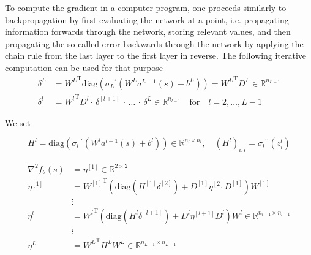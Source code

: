 To compute the gradient in a computer program, one proceeds similarly to backpropagation by first evaluating the network at a point, i.e. propagating information forwards through the network, storing relevant values, and then propagating the so-called error backwards through the network by applying the chain rule from the last layer to the first layer in reverse. The following iterative computation can be used for that purpose
\begin{align*}
    \delta^{L} & = {W^{L}}^{\mathrm{T}} \mathrm{diag}({\sigma_{L}}^{\prime}(W^{L} a^{L-1}(s) + b^{L})) = {W^{L}}^{\mathrm{T}} D^{L} \in \mathbb{R}^{n_{L-1}} \\
    \delta^{l} & = {W^{l}}^{\mathrm{T}} D^{l} \cdot \, \delta^{[l+1]} \, \cdot \, \ldots \,  \cdot \, \delta^{L} \in \mathbb{R}^{n_{l-1}} \quad \text{for} \quad l = 2, \ldots, L-1
\end{align*}


We set 

\begin{equation*}
    H^{l} = \mathrm{diag}({\sigma_{l}}^{\prime \prime}(W^{l} a^{l-1}(s) + b^{l})) \in \mathbb{R}^{n_l \times n_l}, \quad (H^{l})_{i, i} = {\sigma_{l}}^{\prime \prime} (z_{i}^{l})
\end{equation*}

\begin{align*}
    \nabla^{2} f_{\theta}(s) & = \eta^{[1]} \in \mathbb{R}^{2 \times 2} \\
    \eta^{[1]} & = {W^{[1]}}^{\mathrm{T}} \left( \mathrm{diag}(H^{[1]} \delta^{[2]}) + D^{[1]} \eta^{[2]} D^{[1]} \right) W^{[1]} \\
    & \vdots \\
    \eta^{l} & = {W^{l}}^{\mathrm{T}} \left( \mathrm{diag}(H^{l} \delta^{[l+1]}) + D^{l} \eta^{[l+1]} D^{l} \right) W^{l} \in \mathbb{R}^{n_{l-1} \times n_{l-1}} \\
    & \vdots \\
    \eta^{L} & = {W^{L}}^{\mathrm{T}} H^{L} W^{L} \in \mathbb{R}^{n_{L-1} \times n_{L-1}}
\end{align*} 



